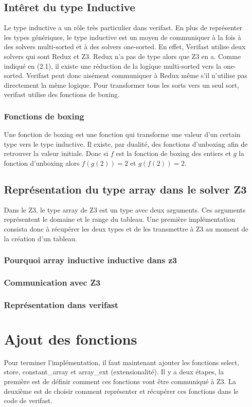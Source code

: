 \documentclass[9pt]{book}
\begin{document}
		\subsection{Int\^eret du type Inductive}
			Le type inductive a un r\^ole tr\`es particulier dans verifast. En plus de repr\'esenter les types g\'en\'eriques, le type inductive est un moyen de communiquer \`a la fois \`a des solvers multi-sorted et \`a des solvers one-sorted. En effet, Verifast utilise deux solvers qui sont Redux et Z3. Redux n'a pas de type alors que Z3 en a. Comme indiqu\'e en (2.1), il existe une r\'eduction de la logique multi-sorted vers la one-sorted. Verifast peut donc ais\'ement communiquer \`a Redux m\^eme s'il n'utilise pas directement la m\^eme logique. Pour transformer tous les sorts vers un seul sort, verifast utilise des fonctions de boxing.
			\subsubsection{Fonctions de boxing}
			Une fonction de boxing est une fonction qui transforme une valeur d'un certain type vers le type inductive. Il existe, par dualit\'e, des fonctions d'unboxing afin de retrouver la valeur initiale. Donc si $f$ est la fonction de boxing des entiers et $g$ la fonction d'unboxing alors $f(g(2)) = 2$ et $g(f(2)) = 2$.
		\subsection{Repr\'esentation du type array dans le solver Z3}
			Dans le Z3, le type array de Z3 est un type avec deux arguments. Ces arguments repr\'esentent le domaine et le range du tableau. Une premi\`ere impl\'ementation consista donc \`a r\'ecup\'erer les deux types et de les transmettre \`a Z3 au moment de la cr\'eation d'un tableau.
			\subsubsection{Pourquoi array inductive inductive dans z3}
			\subsubsection{Communication avec Z3}
			\subsubsection{Repr\'esentation dans verifast}
	\section{Ajout des fonctions}
	Pour terminer l'impl\'ementation, il faut maintenant ajouter les fonctions select, store, constant\_array et array\_ext (extensionalit\'e). Il y a deux \'etapes, la premi\`ere est de d\'efinir comment ces fonctions vont \^etre communiqu\'e \`a Z3. La deuxi\`eme est de choisir comment repr\'esenter  et r\'ecup\'erer ces fonctions dans le code de verifast.
\end{document}
